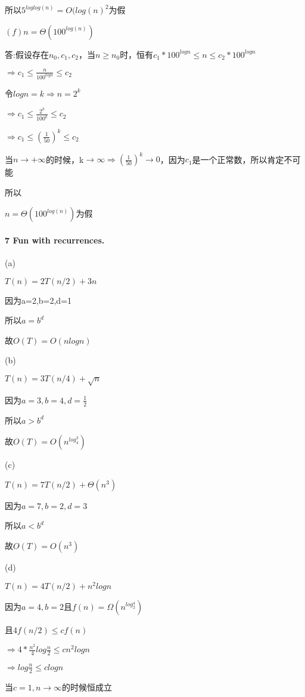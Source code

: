 \documentclass[
]{article}
\begin{document}
所以\(5^{loglog(n)}=O(log(n)^2\)为假

\((f)n=\Theta(100^{log(n)})\)

答:假设存在\(n_0,c_1,c_2\)，当\(n\geq n_0\)时，恒有\(c_1*100^{logn}\leq n\leq c_2*100^{logn}\)

\(\Rightarrow c_1\leq\frac{n}{100^{logn}}\leq c_2\)

令\(logn=k\Rightarrow n=2^k\)

\(\Rightarrow c_1\leq \frac{2^k}{100^k}\leq c_2\)

\(\Rightarrow c_1\leq(\frac{1}{50})^k\leq c_2\)

当\(n\rightarrow+∞\)的时候，k\(\rightarrow∞ \Rightarrow (\frac{1}{50})^k\rightarrow0\)，因为\(c_1\)是一个正常数，所以肯定不可能

所以

\(n=\Theta(100^{log(n)})\)为假

\hypertarget{header-n147}{%
\paragraph{\texorpdfstring{7 \textbf{Fun with
recurrences.}}{7 Fun with recurrences.}}\label{header-n147}}

(a)

\(T(n)=2T(n/2)+3n\)

因为a=2,b=2,d=1

所以\(a=b^d\)

故\(O(T)=O(nlogn)\)

(b)

\(T(n)=3T(n/4)+\sqrt{n}\)

因为\(a=3,b=4,d=\frac{1}{2}\)

所以\(a>b^d\)

故\(O(T)=O(n^{log_4^3})\)

(c)

\(T(n)=7T(n/2)+\Theta(n^3)\)

因为\(a=7,b=2,d=3\)

所以\(a<b^d\)

故\(O(T)=O(n^3)\)

(d)

\(T(n)=4T(n/2)+n^2logn\)

因为\(a=4,b=2\)且\(f(n)=\Omega(n^{log_2^4})\)

且\(4f(n/2)\leq cf(n)\)

\(\Rightarrow4*\frac{n^2}{4}log\frac{n}{2}\leq cn^2logn\)

\(\Rightarrow log\frac{n}{2}\leq clogn\)

当\(c=1,n\rightarrow ∞\)的时候恒成立
\end{document}
